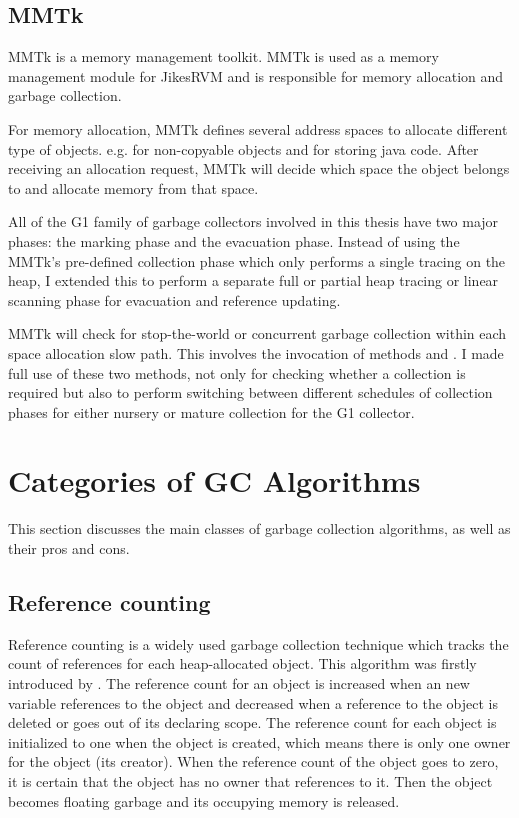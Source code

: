\subsection{MMTk}

MMTk is a memory management toolkit.
MMTk is used as a memory management module for JikesRVM and is responsible for
memory allocation and garbage collection.

For memory allocation, MMTk defines several address spaces to
allocate different type of objects. e.g.  for non-copyable objects
and  for storing java code. After receiving an allocation request,
MMTk will decide which space the object belongs to and allocate memory from that space.

All of the G1 family of garbage collectors involved in this thesis have two major phases:
the marking phase and the evacuation phase.
Instead of using the MMTk's pre-defined 
collection phase which only performs a single tracing on the heap, I extended this
to perform a separate full or partial heap tracing or linear scanning phase for
evacuation and reference updating.

MMTk will check for stop-the-world or concurrent garbage collection
within each space allocation slow path.
This involves the invocation of methods 
and .
I made full use of these two methods,
not only for checking whether a collection is required but also to perform switching between different schedules of collection phases
for either nursery or mature collection for the G1 collector.

\section{Categories of GC Algorithms}
\label{sec:gcalgorithms}

This section discusses the main classes of garbage collection algorithms, as well
as their pros and cons.

\subsection{Reference counting}

Reference counting is a widely used garbage collection technique which tracks the
count of references for each heap-allocated object. This algorithm was firstly
introduced by \cite{collins1960method}.
The reference count for an object is increased when an new variable references to
the object and decreased when a reference
to the object is deleted or goes out of its declaring scope. The reference count for
each object is initialized to one when the object is created, which means there is only one
owner for the object (its creator). When the reference count of the object goes
to zero, it is certain that the object has no owner that references to it. Then the
object becomes floating garbage and its occupying memory is released.

